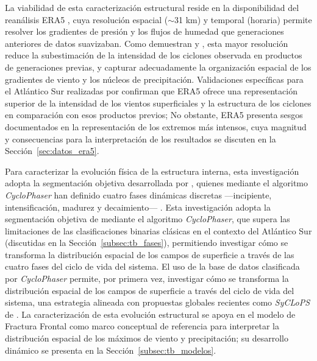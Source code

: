La viabilidad de esta caracterización estructural reside en la disponibilidad del reanálisis ERA5 \citep{hersbach2020era5}, cuya resolución espacial ($\sim$31 km) y temporal (horaria) permite resolver los gradientes de presión y los flujos de humedad que generaciones anteriores de datos suavizaban. Como demuestran \citet{priestley2022improved} y \citet{dalanhese2023new}, esta mayor resolución reduce la subestimación de la intensidad de los ciclones observada en productos de generaciones previas, y capturar adecuadamente la organización espacial de los gradientes de viento y los núcleos de precipitación. Validaciones específicas para el Atlántico Sur realizadas por \citet{gramcianinov2020analysis} confirman que ERA5 ofrece una representación superior de la intensidad de los vientos superficiales y la estructura de los ciclones en comparación con esos productos previos; 
No obstante, ERA5 presenta sesgos documentados en la representación de los extremos más intensos, cuya magnitud y consecuencias para la interpretación de los resultados se discuten en la Sección~\ref{sec:datos_era5}.

Para caracterizar la evolución física de la estructura interna, esta investigación adopta la segmentación objetiva desarrollada por \citet{coutodesouza2024new}, quienes mediante el algoritmo \textit{CycloPhaser} han definido cuatro fases dinámicas discretas —incipiente, intensificación, madurez y decaimiento— \citep{deSouza2025CycloPhaser}. 
Esta investigación adopta la segmentación objetiva de \citet{coutodesouza2024new} mediante el algoritmo \textit{CycloPhaser}, que supera las limitaciones de las clasificaciones binarias clásicas en el contexto del Atlántico Sur (discutidas en la Sección~\ref{subsec:tb_fases}), permitiendo investigar cómo se transforma la distribución espacial de los campos de superficie a través de las cuatro fases del ciclo de vida del sistema.
El uso de la base de datos clasificada por \textit{CycloPhaser} permite, por primera vez, investigar cómo se transforma la distribución espacial de los campos de superficie a través del ciclo de vida del sistema, una estrategia alineada con propuestas globales recientes como \textit{SyCLoPS} de \citet{han2025system}. 
La caracterización de esta evolución estructural se apoya en el modelo de Fractura Frontal \citep{shapiro1990life,shapiro1999bridge} como marco conceptual de referencia para interpretar la distribución espacial de los máximos de viento y precipitación; su desarrollo dinámico se presenta en la Sección~\ref{subsec:tb_modelos}.


